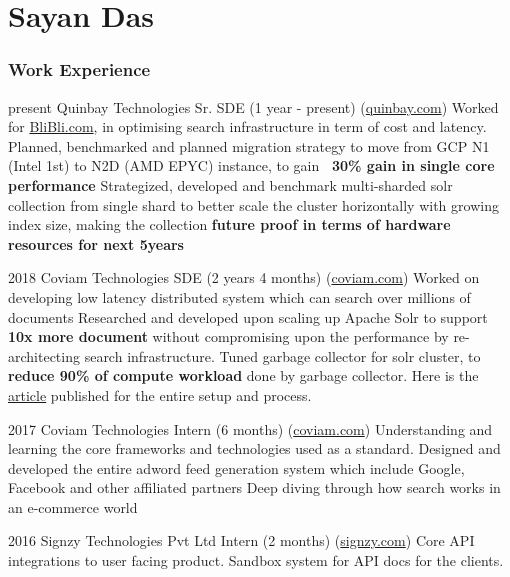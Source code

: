 \documentclass{tccv}
\begin{document}
\part{Sayan Das}

\section{Work Experience}

\begin{yearlist}
	
	\item{present}
	{Quinbay Technologies Sr. SDE (1 year - present) (\href{https://quinbay.com}{quinbay.com})}
	{
		Worked for \href{blibli.com}{BliBli.com}, in optimising search infrastructure in term of cost and latency. \newline
		Planned, benchmarked and planned migration strategy to move from GCP N1 (Intel 1st) to N2D (AMD EPYC) instance, to gain \textbf{~30\% gain in single core performance}
		\newline
		Strategized, developed and benchmark multi-sharded solr collection from single shard to better scale the cluster horizontally  with growing index size, making the collection \textbf{future proof in terms of hardware resources for next 5years}
	}
	
	\item{2018}
	{Coviam Technologies SDE (2 years 4 months) (\href{https://coviam.com}{coviam.com})}
	{
		Worked on developing low latency distributed system which can search over millions of documents \newline
		Researched and developed upon scaling up Apache Solr to support \textbf{10x more document} without compromising upon the performance by re-architecting search infrastructure.
		\newline
		Tuned garbage collector for solr cluster, to  \textbf{reduce 90\% of compute workload} done by garbage collector. Here is the \hyperlink{https://medium.com/bliblidotcom-techblog/optimizing-solr-resources-with-g1-448bb9c49d46}{article} published for the entire setup and process.
	}
	
	\item{2017}
	{Coviam Technologies Intern (6 months) (\href{https://coviam.com}{coviam.com})}
	{
		Understanding and learning the core frameworks and technologies used as a standard. \newline
		Designed and developed the entire adword feed generation system  which include Google, Facebook and other affiliated partners \newline
		Deep diving through how search works in an e-commerce world \newline
	}
	
	\item{2016}
	{Signzy Technologies Pvt Ltd Intern (2 months) (\href{https://signzy.com}{signzy.com})}
	{Core API integrations to user facing product. Sandbox system for API docs for the clients.}
	
\end{yearlist}
\end{document}
